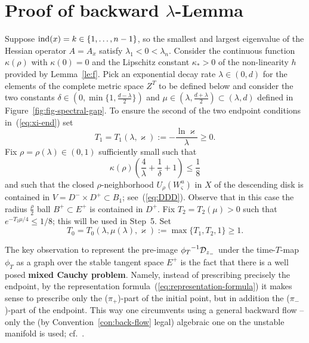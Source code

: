 \documentclass{article}
\begin{document}
\section{Proof of backward $\lambda$-Lemma} %
Suppose ${\rm ind}(x)=k\in\{1,\dots,n-1\}$, so the smallest
and largest eigenvalue of the Hessian operator $A=A_x$
satisfy $\lambda_1<0<\lambda_n$.
Consider the continuous function $\kappa(\rho)$ with $\kappa(0)=0$ and the
Lipschitz constant $\kappa_*>0$ of the non-linearity $h$ provided
by Lemma~\ref{le:f}.
Pick an exponential decay rate $\lambda\in(0,d)$ for the
elements of the complete metric space $Z^T$ to be defined below
and consider the two constants
$
     \delta\in\left(0,\min\{1,\tfrac{d-\lambda}{2}\}\right)
$
and
$
     \mu\in\left(\lambda,\tfrac{d+\lambda}{2}\right)
     \subset(\lambda,d)
$
defined in Figure~\ref{fig:fig-spectral-gap}.
To ensure the second of the two endpoint conditions in~(\ref{eq:xi-end}) set
\begin{equation}\label{eq:T_1}
     T_1=T_1(\lambda,\varkappa)
     :=-\frac{\ln\varkappa}{\lambda}\ge 0.
\end{equation}
Fix $\rho=\rho(\lambda)\in(0,1)$ sufficiently small such that
\begin{equation}\label{eq:rho-backward}
     \kappa(\rho)\left(
     \frac{4}{\lambda}+\frac{1}{\delta}+1\right)
     \le\frac{1}{8}
\end{equation}
and such that the closed $\rho$-neighborhood $U_\rho(W^u_\varsigma)$
in $X$ of the descending disk is contained in $V=D^-\times D^+\subset B_1$; see~(\ref{eq:DDD}).
Observe that in this case the radius $\frac{\rho}{2}$ ball $B^+\subset E^+$ is contained in $D^+$.
Fix $T_2=T_2(\mu)>0$ such that $e^{-T_2 \mu/4}\le 1/8$; this will be used in Step~5. Set
\begin{equation}\label{eq:T_0}
     T_0=T_0(\lambda,\mu(\lambda),\varkappa)
     :=\max\{T_1,T_2,1\}
     \ge 1.
\end{equation}

\begin{remark}
\label{rem:mixed-Cauchy}
The key observation to represent the pre-image 
${\phi_T}^{-1}{\mathcal{D}}_{z_-}$ under the time-$T$-map $\phi_T$ as a graph over the stable tangent space
$E^+$ is the fact that there is a well posed {\bf mixed Cauchy problem}. Namely, instead
of prescribing precisely the endpoint, by the representation
formula~(\ref{eq:representation-formula}) it makes sense to prescribe only the ($\pi_+$)-part
of the initial point, but in addition the  ($\pi_-$)-part of the endpoint.
This way one circumvents using a general backward flow -- only the
(by Convention~\ref{con:back-flow} legal) algebraic one on the unstable manifold is
used; cf.~\cite[Rmk.~3]{weber:2014a}.
\end{remark}
\end{document}
